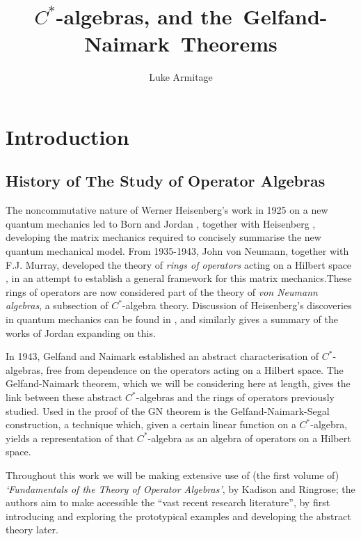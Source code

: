 \documentclass[12pt,a4paper]{report}
\author{Luke Armitage}
\title{$C^\ast$-algebras, and the~Gelfand-Naimark~Theorems}
\theoremstyle{plain}
\theoremstyle{definition}
\newcommand{\1}{\mathbbm{1}}
\begin{document}
\maketitle
\tableofcontents
\listoftodos



\chapter{Introduction}
\section{History of The Study of Operator Algebras}
The noncommutative nature of Werner Heisenberg's work in 1925 on a new quantum 
mechanics \cite{heisenberg25} led to Born and Jordan \cite{bornjordan25}, 
together with Heisenberg \cite{bornjordanheisenberg25}, developing the matrix 
mechanics required to concisely summarise the new quantum mechanical model. From 
1935-1943, John von Neumann, together with F.J. Murray, developed the theory of 
\emph{rings of operators} acting on a Hilbert space 
\cite{vonneumann35,vonneumann37,vonneumann43,vonneumann40}, in an attempt to 
establish a general framework for this matrix mechanics.These rings of operators 
are now considered part of the theory of \emph{von Neumann algebras}, a 
subsection of $C^\ast$-algebra theory. Discussion of Heisenberg's discoveries in 
quantum mechanics can be found in \cite{mackinnon77}, and similarly 
\cite{schroer03} gives a summary of the works of Jordan expanding on this. 


{In 1943, Gelfand and Naimark \cite{gelfand43} established an abstract 
characterisation of $C^\ast$-algebras, free from dependence on the operators 
acting on a Hilbert space. The Gelfand-Naimark theorem, which we will be 
considering here at length, gives the link between these abstract 
$C^\ast$-algebras and the rings of operators previously studied. Used in the 
proof of the GN theorem is the Gelfand-Naimark-Segal construction, a technique 
which, given a certain linear function on a $C^\ast$-algebra, yields a 
representation of that $C^\ast$-algebra as an algebra of operators on a Hilbert 
space.} 

	
Throughout this work we will be making extensive use of (the first volume of) \emph{`Fundamentals of the 
Theory of Operator Algebras'}, by Kadison and Ringrose; the authors aim to make accessible the ``vast 
recent research literature'', by first introducing and exploring the prototypical examples and 
developing the abstract theory later. 
	
\end{document}
